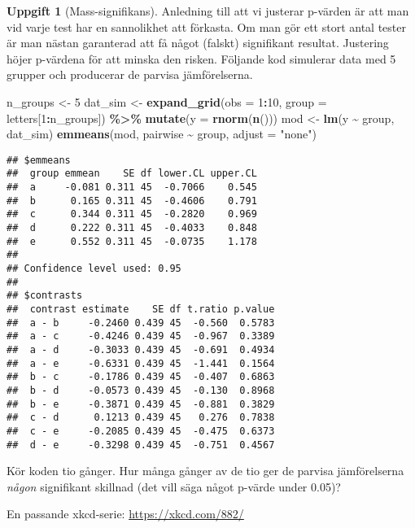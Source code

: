 \documentclass[
]{book}
\newenvironment{Shaded}{\begin{snugshade}}{\end{snugshade}}
\newcommand{\AttributeTok}[1]{\textcolor[rgb]{0.13,0.29,0.53}{#1}}
\newcommand{\DecValTok}[1]{\textcolor[rgb]{0.00,0.00,0.81}{#1}}
\newcommand{\FunctionTok}[1]{\textcolor[rgb]{0.13,0.29,0.53}{\textbf{#1}}}
\newcommand{\NormalTok}[1]{#1}
\newcommand{\OtherTok}[1]{\textcolor[rgb]{0.56,0.35,0.01}{#1}}
\newcommand{\SpecialCharTok}[1]{\textcolor[rgb]{0.81,0.36,0.00}{\textbf{#1}}}
\newcommand{\StringTok}[1]{\textcolor[rgb]{0.31,0.60,0.02}{#1}}
\theoremstyle{definition}
\theoremstyle{definition}
\theoremstyle{definition}
\newtheorem{exercise}{Uppgift}[chapter]
\theoremstyle{definition}
\theoremstyle{remark}
\begin{document}
\begin{exercise}[Mass-signifikans]
Anledning till att vi justerar p-värden är att man vid varje test har en sannolikhet att förkasta. Om man gör ett stort antal tester är man nästan garanterad att få något (falskt) signifikant resultat. Justering höjer p-värdena för att minska den risken. Följande kod simulerar data med 5 grupper och producerar de parvisa jämförelserna.

\begin{Shaded}
\begin{Highlighting}[]
\NormalTok{n\_groups }\OtherTok{\textless{}{-}} \DecValTok{5}
\NormalTok{dat\_sim }\OtherTok{\textless{}{-}} \FunctionTok{expand\_grid}\NormalTok{(}\AttributeTok{obs =} \DecValTok{1}\SpecialCharTok{:}\DecValTok{10}\NormalTok{, }\AttributeTok{group =}\NormalTok{ letters[}\DecValTok{1}\SpecialCharTok{:}\NormalTok{n\_groups]) }\SpecialCharTok{\%\textgreater{}\%} \FunctionTok{mutate}\NormalTok{(}\AttributeTok{y =} \FunctionTok{rnorm}\NormalTok{(}\FunctionTok{n}\NormalTok{()))}
\NormalTok{mod }\OtherTok{\textless{}{-}} \FunctionTok{lm}\NormalTok{(y }\SpecialCharTok{\textasciitilde{}}\NormalTok{ group, dat\_sim)}
\FunctionTok{emmeans}\NormalTok{(mod, pairwise }\SpecialCharTok{\textasciitilde{}}\NormalTok{ group, }\AttributeTok{adjust =} \StringTok{"none"}\NormalTok{)}
\end{Highlighting}
\end{Shaded}

\begin{verbatim}
## $emmeans
##  group emmean    SE df lower.CL upper.CL
##  a     -0.081 0.311 45  -0.7066    0.545
##  b      0.165 0.311 45  -0.4606    0.791
##  c      0.344 0.311 45  -0.2820    0.969
##  d      0.222 0.311 45  -0.4033    0.848
##  e      0.552 0.311 45  -0.0735    1.178
## 
## Confidence level used: 0.95 
## 
## $contrasts
##  contrast estimate    SE df t.ratio p.value
##  a - b     -0.2460 0.439 45  -0.560  0.5783
##  a - c     -0.4246 0.439 45  -0.967  0.3389
##  a - d     -0.3033 0.439 45  -0.691  0.4934
##  a - e     -0.6331 0.439 45  -1.441  0.1564
##  b - c     -0.1786 0.439 45  -0.407  0.6863
##  b - d     -0.0573 0.439 45  -0.130  0.8968
##  b - e     -0.3871 0.439 45  -0.881  0.3829
##  c - d      0.1213 0.439 45   0.276  0.7838
##  c - e     -0.2085 0.439 45  -0.475  0.6373
##  d - e     -0.3298 0.439 45  -0.751  0.4567
\end{verbatim}

Kör koden tio gånger. Hur många gånger av de tio ger de parvisa jämförelserna \emph{någon} signifikant skillnad (det vill säga något p-värde under 0.05)?

En passande xkcd-serie: \url{https://xkcd.com/882/}
\end{exercise}
\end{document}
